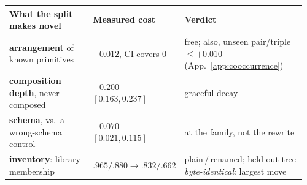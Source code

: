 {\scriptsize\setlength{\tabcolsep}{3pt}\renewcommand{\arraystretch}{0.94}%
\setlength{\aboverulesep}{0.5pt}\setlength{\belowrulesep}{0.5pt}
\noindent\begin{tabular}{@{}p{0.315\linewidth}p{0.215\linewidth}p{0.43\linewidth}@{}}
\toprule
\textbf{What the split makes novel} & \textbf{Measured cost} & \textbf{Verdict} \\
\midrule
\textbf{arrangement} of known primitives & $+0.012$, CI covers $0$ & free; also, unseen pair/triple $\le+0.010$ (App.~\ref{app:cooccurrence}) \\
\textbf{composition depth}, never composed & $+0.200$ $[0.163,0.237]$ & graceful decay \\
\textbf{schema}, vs.\ a wrong-schema control & $+0.070$ $[0.021,0.115]$ & at the family, not the rewrite \\
\textbf{inventory}: library membership & $.965/.880 \to .832/.662$ & plain\,/\,renamed; held-out tree \emph{byte-identical}: largest move \\

\end{tabular}}
